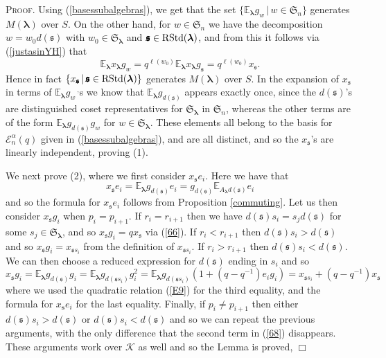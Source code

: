 \documentclass[10pt,a4,twoside,hidelinks,rm]{article}
\newcommand{\kk}{\mathcal{K}}
\newcommand\bs{\mathbf{s}}
\newcommand{\Bs}{\pmb{\mathfrak{s}}}
\newcommand{\Si}{\mathfrak{S}}
\newcommand{\rstd}{{\rm RStd}}
\newcommand{\Ea}{ {\mathcal E}_n^{\alpha}(q)}
\newcommand\blambda{{\boldsymbol\lambda}}
\newcommand\be{\mathbb{E}}
\theoremstyle{plain}
\newenvironment{demo}
{\textsc{Proof.}} {\quad \hfill $\Box$}
\begin{document}
\begin{demo}
Using (\ref{basessubalgebras}), we get that 
the set $ \{ \be_{\blambda} g_w \, | \, w \in \Si_n \}$ generates $ M(\blambda) $ over $ S$. 
On the other hand, for $ w \in \Si_n $ we have the decomposition 
$ w = w_0 d(\Bs) $ with $ w_0 \in \Si_{\blambda} $ and $ \Bs \in \rstd(\blambda) $, and from this it follows 
via ({\ref{justasinYH}}) that 
\begin{equation}\label{66}
  \be_{\blambda}   x_{\blambda} g_w = q^{\ell(w_0)} \be_{\blambda} x_{\blambda} g_{\Bs} =
  q^{\ell(w_0)} x_{\Bs}.
\end{equation}  
Hence in fact $ \{x_{\Bs}\, |\,  \Bs \in \rstd(\blambda) \}$ generates $ M(\blambda)$ over
$ S$. 
In the expansion of $ x_{\Bs} $ in terms of $ \be_{\blambda} g_{w}^{\,\,\,\,\,\, ,} $s we know that
$ \be_{\blambda}g_{d(\Bs)} $
appears exactly once,
since the 
$ d(\Bs) $'s are distinguished coset representatives for $ \Si_{\blambda}$ in $ \Si_n$,
whereas the other terms are of the form $  \be_{\blambda} g_{d(\Bs)} g_{w} $ for $ w \in \Si_{\blambda}$. 
These elements all belong to the basis for $ \Ea $ given in (\ref{basessubalgebras}), and are all distinct, 
and so the $ x_{\Bs}$'s are linearly independent, proving (1).

We next prove (2), where we 
first consider $ x_{\Bs} e_i $. Here we have that 
\begin{equation} x_{\Bs} e_i = 
  \be_{\blambda} g_{d(\Bs)} e_i = g_{d(\Bs)} \be_{A_{\blambda} d(\Bs)}  e_i
\end{equation}  
and so the formula for $ x_{\Bs} e_i  $ follows from Proposition \ref{commuting}. 
Let us then  consider $ x_{\Bs} g_i $ when $ p_i = p_{i+1}$.
If $ r_i = r_{i+1} $ then we have $ d(\Bs) s_i = s_j d(\Bs) $
for some $ s_j \in \Si_{\blambda} $, 
and so $ x_{\Bs} g_i = q x_{\Bs}$
via (\ref{66}). If $ r_i < r_{i+1} $ then $ d(\Bs) s_i > d(\Bs)  $ and so
$ x_{\Bs} g_i =  x_{\Bs s_i}$
from the definition of $ x_{\Bs s_i}$. If $ r_i > r_{i+1} $
then $ d(\Bs) s_i < d(\Bs)  $. We can then choose a reduced expression for $ d(\Bs) $ ending
in $ s_i $ and so 
\begin{equation}\label{68}
  x_{\Bs} g_i = \be_{\blambda} g_{d(\Bs) } g_i = \be_{\blambda} g_{d(\Bs s_i) } g_i^2 =
  \be_{\blambda} g_{d(\Bs s_i) } \left(1 + (q-q^{-1}) e_i g_i \right) =    x_{\Bs s_i} + (q-q^{-1}) x_{\Bs }    
\end{equation}
where we used the quadratic relation (\ref{E9}) for the third equality, and the formula for $ x_{\bs} e_i $
for the last equality. Finally, if $ p_i \neq  p_{i+1}$ then either 
$ d(\Bs) s_i > d(\Bs)  $ or   $ d(\Bs) s_i < d(\Bs)  $ and so we can repeat the previous arguments, with
the only difference that the second term in (\ref{68}) disappears.
These arguments work over $ \kk $ as well and so the Lemma is proved,
\end{demo}
\medskip
\end{document}
